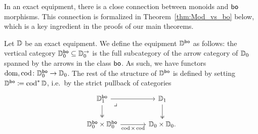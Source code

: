 \documentclass[11pt,oneside,article]{memoir}
\begin{document}
In an exact equipment, there is a close connection between monoids and $\mathsf{bo}$ morphisms. This
connection is formalized in Theorem~\ref{thm:Mod_vs_bo} below, which is a key ingredient in the
proofs of our main theorems.

\begin{definition}
  Let $\mathbb{D}$ be an exact equipment. We define the equipment $\mathbb{D}^{\mathsf{bo}}$ as follows: the
  vertical category $\mathbb{D}_0^{\mathsf{bo}}\subseteq\mathbb{D}_0^{\rightarrow}$ is the full subcategory of the
  arrow category of $\mathbb{D}_0$ spanned by the arrows in the class $\mathsf{bo}$. As such, we have functors
  $\operatorname{dom},\operatorname{cod}\colon\mathbb{D}_0^{\mathsf{bo}}\to\mathbb{D}_0$. The rest of the structure of $\mathbb{D}^{\mathsf{bo}}$ is
  defined by setting $\mathbb{D}^{\mathsf{bo}}\coloneqq\operatorname{cod}^*\mathbb{D}$, i.e.\ by the strict pullback of
  categories
  \[ \begin{tikzcd}[column sep=large]
    \dcat{D}_1^{\bo} \ar[r] \ar[d, two heads] \ar[dr,phantom,"\lrcorner" very near start]
      & \dcat{D}_1 \ar[d, two heads] \\
    \dcat{D}_0^{\bo}\times\dcat{D}_0^{\bo} \ar[r,"\cod\times\cod"']
      & \dcat{D}_0\times\dcat{D}_0.
  \end{tikzcd} \]
\end{definition}
\end{document}

